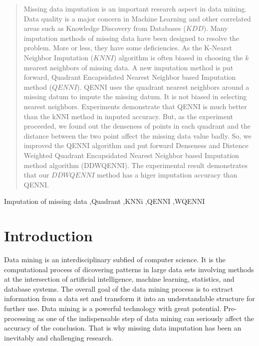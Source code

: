 \documentclass[print]{jicspack}
\begin{document}
\begin{premaker}
\begin{abstract}
Missing data imputation is an important research aspect in data mining. Data quality is a major concern in Machine Learning and other correlated areas such as Knowledge Discovery from Databases ($KDD$). Many imputation methods of missing data have been designed to resolve the problem. More or less, they have some deficiencies. As the K-Nearst Neighbor Imputation ($KNNI$) algorithm is often biased in choosing the $k$ mearest neighbors of missing data. A new imputation method is put forward, Quadrant Encapsidated Nearest Neighbor based Imputation method ($QENNI$). QENNI uses the quadrant nearest neighbors around a missing datum to impute the missing datum. It is not biased in selecting nearest neighbors. Experiments demonstrate that QENNI is much better than the kNNI method in imputed accuracy. But, as the experiment proceeded, we found out the denseness of points in each quadrant and the distance between the two point affect the missing data value badly. So, we improved the QENNI algorithm and put forward Denseness and Distence Weighted Quadrant Encapsidated Nearest Neighbor based Imputation method algorithm (DDWQENNI). The experimental result demonstrates that our $DDWQENNI$ method has a higer imputation accuracy than QENNI.
\end{abstract}
\begin{keyword}
Imputation of missing data \sep Quadrant  \sep KNNi \sep QENNI \sep WQENNI
\end{keyword}
\end{premaker}

\section{Introduction}
\label{Maintext}

Data mining \cite{NumeApp} is an interdisciplinary subfied of computer science. It is the computational process of dicovering patterns in large data sets involving methods at the intersection of artificial intelligence, machine learning, statistics, and database systems. The overall goal of the data mining process is to extract information from a data set and transform it into an understandable structure for further use. Data mining is a powerful technology with great potential. Pre-processing as one of the indispensable step of data mining can seriously affect the accuracy of the conclusion. That is why missing data imputation has been an inevitably and challenging research.
\end{document}
